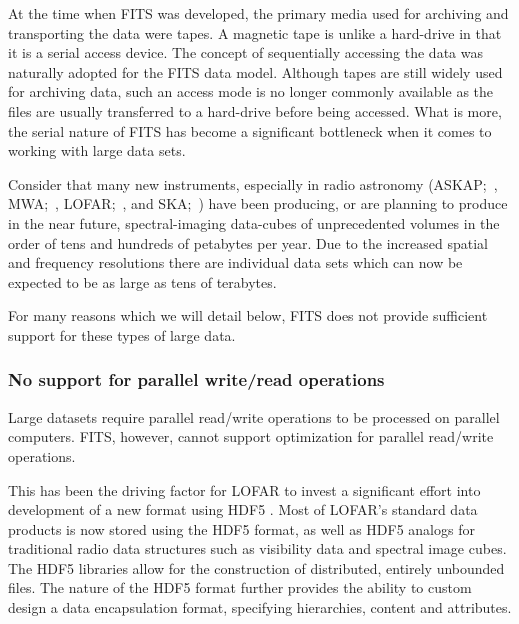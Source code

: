 \documentclass[final,authoryear,5p,times,twocolumn]{elsarticle}
\begin{document}
{{At the time when FITS was developed, the primary media used for
archiving and transporting the data were tapes. A magnetic tape is
unlike a hard-drive in that it is a serial access device.  The concept
of sequentially accessing the data was naturally adopted for the FITS data
model.  Although tapes are still widely used for archiving data,
such an access mode is no longer commonly available as the files are usually
transferred to a hard-drive before being accessed. What is more, the
serial nature of FITS has become a significant bottleneck when it comes
to working with large data sets.


Consider that many new instruments, especially in radio astronomy
(ASKAP;~\citealp{2009IEEEP..97.1507D},
MWA;~\citealp{2013PASA...30....7T}, LOFAR;~\citealp{2013A&A...556A...2V}, and
SKA;~\citealp{ska-exascale})
have been producing, or are planning to produce in the near future,
spectral-imaging data-cubes of unprecedented volumes in the order of
tens and hundreds of petabytes per year. Due to the increased spatial and frequency
resolutions there are individual data sets which can now be expected to be as
large as tens of terabytes.


For many reasons which we will detail below, FITS does not provide sufficient
support for these types of large data.

%

\subsubsection{No support for parallel write/read operations}
\label{subsection_parallel_io}

Large datasets require parallel read/write operations to be processed on
parallel computers.  FITS, however, cannot support optimization for parallel 
read/write operations.

This has been the driving factor for LOFAR to
invest a significant effort into development of a new format using
HDF5  \citep{2012ASPC..461..283A}. Most of LOFAR's standard data products
is now stored using the HDF5 format, as well as HDF5 analogs for traditional radio data
structures such as visibility data and spectral image cubes. The HDF5 libraries allow
for the construction of distributed, entirely unbounded files. The nature of the HDF5
format further provides the ability to custom design a data encapsulation format,
specifying hierarchies, content and attributes.

}}
\end{document}
